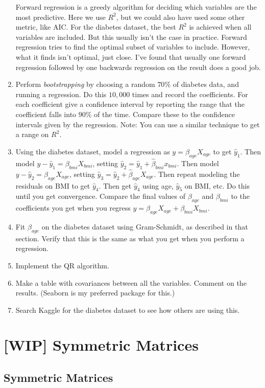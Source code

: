 \documentclass{amsbook}
\begin{document}
\begin{enumerate}
Forward regression is a greedy algorithm for deciding which variables are the most predictive.  Here we use $R^2$, but we could also have used some other metric, like AIC.  For the diabetes dataset, the best $R^2$ is achieved when all variables are included.  But this usually isn't the case in practice.  Forward regression tries to find the optimal subset of variables to include.  However, what it finds isn't optimal, just close.  I've found that usually one forward regression followed by one backwards regression on the result does a good job.
\item Perform {\em bootstrapping} by choosing a random $70\%$ of diabetes data, and running a regression.  Do this $10,000$ times and record the coefficients.  For each coefficient give a confidence interval by reporting the range that the coefficient falls into $90\%$ of the time.  Compare these to the confidence intervals given by the regression.  Note:  You can use a similar technique to get a range on $R^2$.
\item Using the diabetes dataset, model a regression as $y=\beta_{age}X_{age}$ to get $\hat y_1$.  Then model $y-\hat y_1=\beta_{bmi}X_{bmi}$, setting $\hat y_2=\hat y_1+\hat\beta_{bmi}x_{bmi}$.  Then model $y-\hat y_2=\beta_{age}X_{age}$, setting $\hat y_3=\hat y_2+\hat\beta_{age}X_{age}$.  Then repeat modeling the residuals on BMI to get $\hat y_4$.  Then get $\hat y_4$ using age, $\hat y_5$ on BMI, etc.  Do this until you get convergence.  Compare the final values of $\beta_{age}$ and $\beta_{bmi}$ to the coefficients you get when you regress $y=\beta_{age}X_{age}+\beta_{bmi}X_{bmi}$.
\item Fit $\beta_{age}$ on the diabetes dataset using Gram-Schmidt, as described in that section.  Verify that this is the same as what you get when you perform a regression.
\item Implement the QR algorithm.
\item Make a table with covariances between all the variables.  Comment on the results.  (Seaborn is my preferred package for this.)
\item Search Kaggle for the diabetes dataset to see how others are using this.
\end{enumerate}

\chapter{[WIP] Symmetric Matrices}
\section{Symmetric Matrices}\label{SymmetricMatrices}
\end{document}

